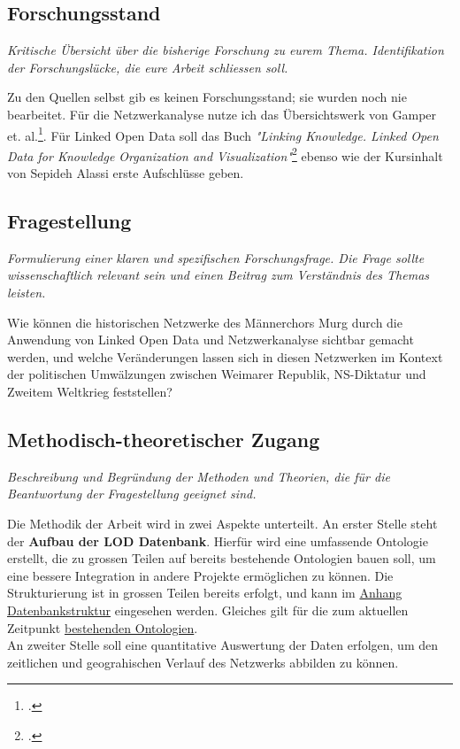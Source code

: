 \documentclass[12pt, a4paper, ngerman, bidi=default]{article}
\begin{document}
\begin{spacing}{1.5}
\subsection{\textbf{Forschungsstand}} 
\textit{Kritische Übersicht über die bisherige Forschung zu eurem Thema.
Identifikation der Forschungslücke, die eure Arbeit schliessen soll.}

Zu den Quellen selbst gib es keinen Forschungsstand; sie wurden noch nie bearbeitet. Für die Netzwerkanalyse nutze ich das Übersichtswerk von Gamper et. al.\footcite{gamper_knoten_2015}. Für Linked Open Data soll das Buch \textit{"Linking Knowledge. Linked Open Data for Knowledge Organization and Visualization"}\footcite{richard_linking_2022} ebenso wie der Kursinhalt von Sepideh Alassi erste Aufschlüsse geben.

\subsection{\textbf{Fragestellung}}
\textit{Formulierung einer klaren und spezifischen Forschungsfrage.
Die Frage sollte wissenschaftlich relevant sein und einen Beitrag zum Verständnis des Themas leisten.}

 Wie können die historischen Netzwerke des Männerchors Murg durch die Anwendung von Linked Open Data und Netzwerkanalyse sichtbar gemacht werden, und welche Veränderungen lassen sich in diesen Netzwerken im Kontext der politischen Umwälzungen zwischen Weimarer Republik, NS-Diktatur und Zweitem Weltkrieg feststellen?

\subsection {\textbf{Methodisch-theoretischer Zugang}}
\textit{Beschreibung und Begründung der Methoden und Theorien, die für die Beantwortung der Fragestellung geeignet sind.}

 Die Methodik der Arbeit wird in zwei Aspekte unterteilt. An erster Stelle steht der \textbf{Aufbau der LOD Datenbank}. Hierfür wird eine umfassende Ontologie erstellt, die zu grossen Teilen auf bereits bestehende Ontologien bauen soll, um eine bessere Integration in andere Projekte ermöglichen zu können. Die Strukturierung ist in grossen Teilen bereits erfolgt, und kann im  \hyperref[sec:Anhang Datenbankstruktur]{Anhang Datenbankstruktur} eingesehen werden. Gleiches gilt für die zum aktuellen Zeitpunkt \hyperref[tab:bestehenden Ontologien]{bestehenden Ontologien}.\\
An zweiter Stelle soll eine quantitative Auswertung der Daten erfolgen, um den zeitlichen und geograhischen Verlauf des Netzwerks abbilden zu können.  


\end{spacing}
\end{document}
